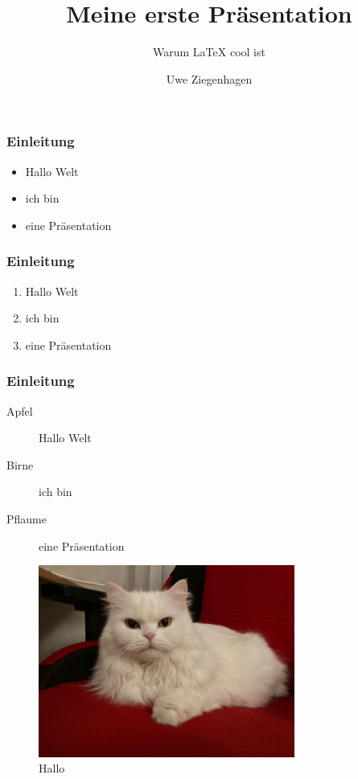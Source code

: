 \documentclass[12pt,ngerman]{beamer}
\title{Meine erste Präsentation}
\author{Uwe Ziegenhagen}
\subtitle{Warum LaTeX cool ist}
\institute{Dante e.V.}
\begin{document}
\begin{frame}

\maketitle


\end{frame}

\begin{frame}
\frametitle{Einleitung}

\begin{itemize}
\item Hallo Welt
\item ich bin 
\item eine Präsentation
\end{itemize}


\end{frame}

\begin{frame}
\frametitle{Einleitung}

\begin{enumerate}
\item Hallo Welt
\item ich bin 
\item eine Präsentation
\end{enumerate}


\end{frame}

\begin{frame}
\frametitle{Einleitung}

\begin{description}
\item [Apfel] Hallo Welt
\item [Birne]  ich bin 
\item [Pflaume] eine Präsentation
\end{description}


\end{frame}

\begin{frame}

\begin{figure}
\begin{center}
\includegraphics[width=0.75\textwidth]{Bilder/Katze}
\caption{Hallo}
\end{center}
\end{figure}

\end{frame}
\end{document}

